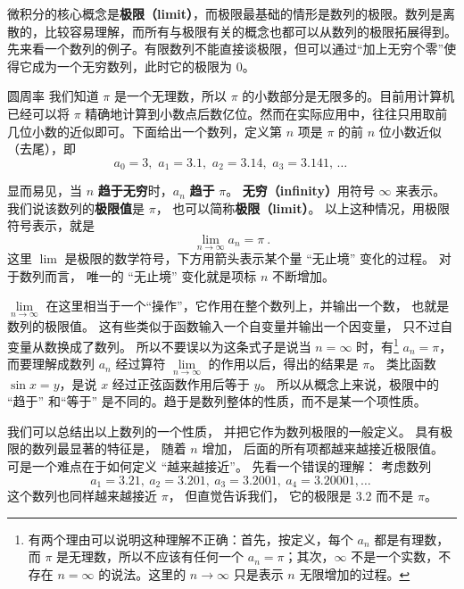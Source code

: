 
微积分的核心概念是\textbf{极限（limit）}，而极限最基础的情形是数列的极限。数列是离散的，比较容易理解，而所有与极限有关的概念也都可以从数列的极限拓展得到。 先来看一个数列的例子。有限数列不能直接谈极限，但可以通过“加上无穷个零”使得它成为一个无穷数列，此时它的极限为 $0$。

\begin{example}{圆周率}\label{ex_Lim0_1}
我们知道 $\pi$ 是一个无理数，所以 $\pi$ 的小数部分是无限多的。目前用计算机已经可以将 $\pi$ 精确地计算到小数点后数亿位。然而在实际应用中，往往只用取前几位小数的近似即可。下面给出一个数列，定义第 $n$ 项是 $\pi$ 的前 $n$ 位小数近似（去尾），即
\begin{equation}\label{eq_Lim0_1}
a_0 = 3,\,\, a_1 = 3.1,\,\, a_2 = 3.14,\,\, a_3 = 3.141,\,\dots~
\end{equation}

显而易见，当 $n$ \textbf{趋于无穷}时，$a_n$ \textbf{趋于} $\pi$。 \textbf{无穷（infinity）}用符号 $\infty$ 来表示。 我们说该数列的\textbf{极限值}是 $\pi$， 也可以简称\textbf{极限（limit）}。 以上这种情况，用极限符号表示，就是
\begin{equation}
\lim_{n \to \infty } {a_n} = \pi ~.
\end{equation}
这里 $\lim$ 是极限的数学符号，下方用箭头表示某个量 “无止境” 变化的过程。 对于数列而言， 唯一的 “无止境” 变化就是项标 $n$ 不断增加。%
\end{example}

$\lim\limits_{n \to \infty }$ 在这里相当于一个“操作”，它作用在整个数列上，并输出一个数， 也就是数列的极限值。 这有些类似于函数输入一个自变量并输出一个因变量， 只不过自变量从数换成了数列。 所以不要误以为这条式子是说当 $n = \infty$ 时，有\footnote{有两个理由可以说明这种理解不正确：首先，按定义，每个 $a_n$ 都是有理数，而 $\pi$ 是无理数，所以不应该有任何一个 $a_n=\pi$；其次，$\infty$ 不是一个实数，不存在 $n=\infty$ 的说法。这里的 $n\to\infty$ 只是表示 $n$ 无限增加的过程。} $a_n=\pi$， 而要理解成数列 $a_n$ 经过算符 $\lim\limits_{n \to \infty }$ 的作用以后，得出的结果是 $\pi$。 类比函数 $\sin x = y$，是说 $x$ 经过正弦函数作用后等于 $y$。 所以从概念上来说，极限中的 “趋于” 和“等于” 是不同的。趋于是数列整体的性质，而不是某一个项性质。

我们可以总结出以上数列的一个性质， 并把它作为数列极限的一般定义。 具有极限的数列最显著的特征是， 随着 $n$ 增加， 后面的所有项都越来越接近极限值。 可是一个难点在于如何定义 “越来越接近”。 先看一个错误的理解： 考虑数列
\begin{equation}\label{eq_Lim0_2}
a_1 = 3.21,\ a_2 = 3.201,\ a_3 = 3.2001,\ a_4 = 3.20001, \dots~
\end{equation}
这个数列也同样越来越接近 $\pi$， 但直觉告诉我们， 它的极限是 $3.2$ 而不是 $\pi$。

